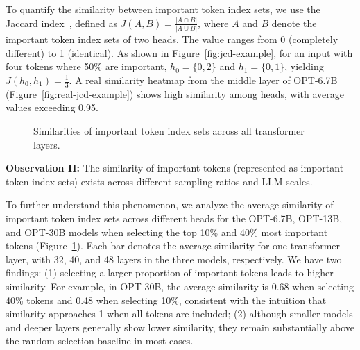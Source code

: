 To quantify the similarity between important token index sets, we use the Jaccard index~\cite{jaccard-18}, defined as 
\( J(A, B) = \frac{|A \cap B|}{|A \cup B|} \),
where \(A\) and \(B\) denote the important token index sets of two heads. 
The value ranges from 0 (completely different) to 1 (identical). 
As shown in Figure~\ref{fig:jcd-example}, for an input with four tokens where 50\% are important, 
\( h_0 = \{0, 2\} \) and \( h_1 = \{0, 1\} \), yielding \( J(h_0, h_1) = \frac{1}{3} \). 
A real similarity heatmap from the middle layer of OPT-6.7B (Figure~\ref{fig:real-jcd-example}) 
shows high similarity among heads, with average values exceeding 0.95.


\begin{figure}
	\centering
	\vspace{-0.1in}
	\caption{Similarities of important token index sets across all transformer layers.}
	\label{fig:simi-values}
	\vspace{-0.1in}
\end{figure}


\noindent
\textbf{Observation II:}{
	The similarity of important tokens (represented as important token index sets) exists across different sampling ratios and LLM scales.
}

To further understand this phenomenon, we analyze the average similarity of important token index sets across different heads for the OPT-6.7B, OPT-13B, and OPT-30B models when selecting the top 10\% and 40\% most important tokens (Figure~\ref{fig:simi-values}). 
Each bar denotes the average similarity for one transformer layer, with 32, 40, and 48 layers in the three models, respectively. 
We have two findings: 
(1) selecting a larger proportion of important tokens leads to higher similarity. For example, in OPT-30B, the average similarity is 0.68 when selecting 40\% tokens and 0.48 when selecting 10\%, consistent with the intuition that similarity approaches 1 when all tokens are included; 
(2) although smaller models and deeper layers generally show lower similarity, they remain substantially above the random-selection baseline in most cases.


